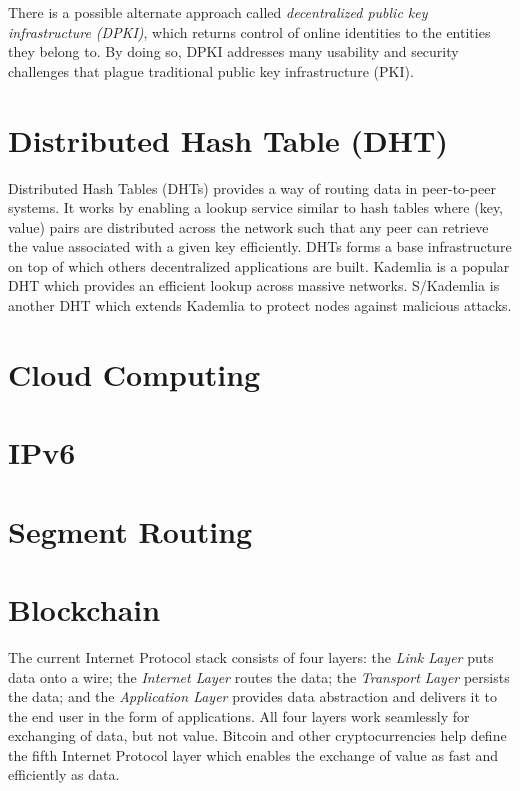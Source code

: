 	There is a possible alternate approach called \textit{decentralized public key infrastructure (DPKI)}, which returns control of online identities to the entities they belong to. By doing so, DPKI addresses many usability and security challenges that plague traditional public key infrastructure (PKI)\cite{allen2015decentralized}.
	
\section{Distributed Hash Table (DHT)}
	Distributed Hash Tables (DHTs)\cite{galuba2009distributed} provides a way of routing data in peer-to-peer systems. It works by enabling a lookup service similar to hash tables where (key, value) pairs are distributed across the network such that any peer can retrieve the value associated with a given key efficiently. DHTs forms a base infrastructure on top of which others decentralized applications are built. Kademlia\cite{maymounkov2002kademlia} is a popular DHT which provides an efficient lookup across massive networks. S/Kademlia\cite{baumgart2007s} is another DHT which extends Kademlia to protect nodes against malicious attacks.

\section{Cloud Computing}

\section{IPv6}

\section{Segment Routing}

\section{Blockchain}
	The current Internet Protocol stack consists of four layers: the \textit{Link Layer} puts data onto a wire; the \textit{Internet Layer} routes the data; the \textit{Transport Layer} persists the data; and the \textit{Application Layer} provides data abstraction and delivers it to the end user in the form of applications. All four layers work seamlessly for exchanging of data, but not value. Bitcoin\cite{nakamoto2008bitcoin} and other cryptocurrencies help define the fifth Internet Protocol layer which enables the exchange of value as fast and efficiently as data\cite{raval2016decentralized}.
	
